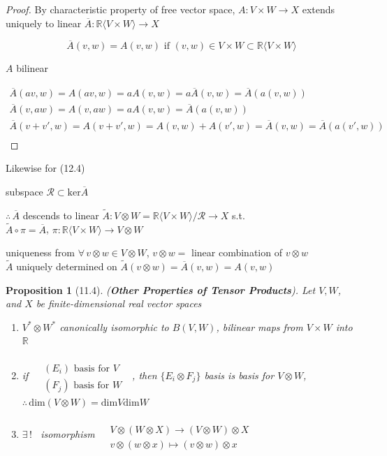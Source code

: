 \documentclass[11pt]{amsart}
\newtheorem{proposition}{Proposition}
\theoremstyle{definition}
\begin{document}
\begin{proof}
By characteristic property of free vector space, $A: V\times W \to X$ extends uniquely to linear $\overline{A} : \mathbb{R} \langle V \times W \rangle \to X$

\[
\overline{A}(v,w) = A(v,w) \text{ if } (v,w) \in V\times W \subset \mathbb{R}\langle V \times W \rangle
\]

$A$ bilinear

\[
\begin{aligned}
  \overline{A}(av,w) = A(av,w) = aA(v,w) = a\overline{A}(v,w) = \overline{A}(a(v,w)) \\
  \overline{A}(v,aw) = A(v,aw) = aA(v,w)  = \overline{A}(a(v,w)) \\
  \overline{A}(v+v',w)  = A(v+v',w) = A(v,w) +  A(v',w) = \overline{A}(v,w) = \overline{A}(a(v',w)) \\
\end{aligned}
\]
\end{proof}

Likewise for (12.4)

subspace $\mathcal{R} \subset \text{ker}{\overline{A}}$

$\therefore \, \overline{A}$ descends to linear $\widetilde{A} : V\otimes W = \mathbb{R} \langle V\times W \rangle / \mathcal{R} \to X$ s.t. \\
$\widetilde{A} \circ \pi = \overline{A}$, $\pi: \mathbb{R}\langle V \times W \rangle \to V\otimes W$

uniqueness from $\forall \, v \otimes w \in V \otimes W$, $v\otimes w =$ linear combination of $v\otimes w$ \\
$\widetilde{A}$ uniquely determined on $\widetilde{A}(v\otimes w) = \overline{A}(v,w) = A(v,w)$


\begin{proposition}[11.4] (\textbf{Other Properties of Tensor Products}).  Let $V, W$, and $X$ be finite-dimensional real vector spaces
\begin{enumerate}
  \item[(a)] $V^* \otimes W^*$ canonically isomorphic to $B(V,W)$, bilinear maps from $V\times W$ into $\mathbb{R}$
  \item[(b)] if $\begin{aligned} & \quad \\ & (E_i) \text{ basis for $V$ } \\ & (F_j) \text{ basis for $W$ } \end{aligned}$, then $\lbrace E_i \otimes F_j \rbrace$ basis is basis for $V\otimes W$, $\therefore \, \text{dim}{(V\otimes W)} = \text{dim}{V} \text{dim}{W}$
  \item[(c)] $\exists \, !$ \, isomorphism $\begin{aligned} & \quad \\ & V\otimes (W\otimes X) \to (V \otimes W) \otimes X \\ & v\otimes (w \otimes x) \mapsto (v\otimes w)\otimes x \end{aligned}$
\end{enumerate}
\end{proposition}
\end{document}
